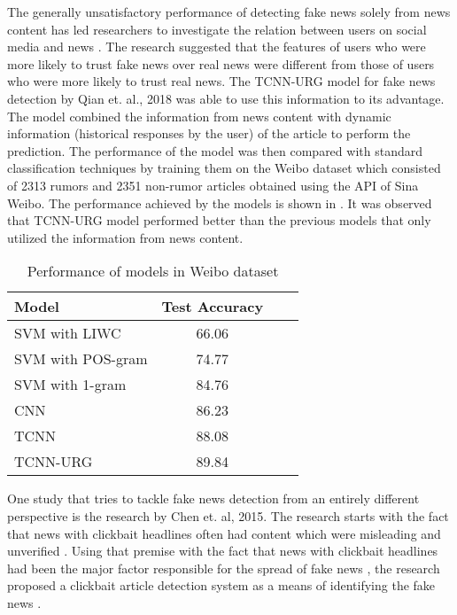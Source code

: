 The generally unsatisfactory performance of detecting fake news solely from news content has led researchers to investigate the relation between users on social media and news \cite{shu2018understanding}. The research suggested that the features of users who were more likely to trust fake news over real news were different from those of users who were more likely to trust real news. The TCNN-URG model for fake news detection by Qian et. al., 2018 was able to use this information to its advantage. The model combined the information from news content with dynamic information (historical responses by the user) of the article to perform the prediction. The performance of the model was then compared with standard classification techniques by training them on the Weibo dataset\cite{ma2016detecting} which consisted of 2313 rumors and 2351 non-rumor articles obtained using the API of Sina Weibo. The performance achieved by the models is shown in  \cite{qian2018neural}. It was observed that TCNN-URG model performed better than the previous models that only utilized the information from news content.

\begin{table}[h]
\begin{center}
\caption{Performance of models in Weibo dataset}
\label{tbl:weibo_performance}
\begin{tabular}{lccc}
\toprule 
\rule[-1pt]{0pt}{14pt}Model&Test Accuracy\\
\midrule 
SVM with LIWC&66.06\\
SVM with POS-gram&74.77\\
SVM with 1-gram&84.76\\
CNN&86.23\\
TCNN&88.08\\
TCNN-URG&89.84\\
\bottomrule
\end{tabular}
\end{center}
\end{table}

One study that tries to tackle fake news detection from an entirely different perspective is the research by Chen et. al, 2015. The research starts with the fact that news with clickbait headlines often had content which were misleading and unverified \cite{silverman2016analysis}. Using that premise with the fact that news with clickbait headlines had been the major factor responsible for the spread of fake news \cite{silverman2015lies}, the research proposed a clickbait article detection system as a means of identifying the fake news \cite{chen2015misleading}.